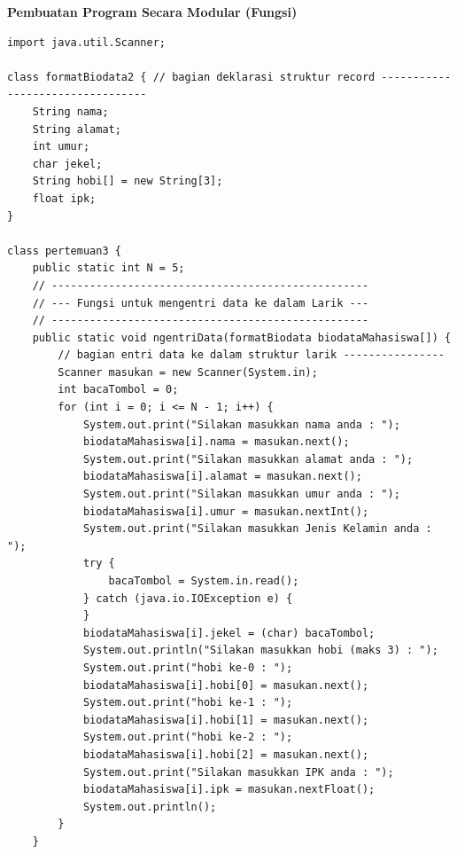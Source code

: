 \documentclass[a4paper,12pt]{article}
\begin{document}
\begin{center}
\end{center}

\textbf{Pembuatan Program Secara Modular (Fungsi)}
\begin{lstlisting}
import java.util.Scanner;

class formatBiodata2 { // bagian deklarasi struktur record ---------------------------------
    String nama;
    String alamat;
    int umur;
    char jekel;
    String hobi[] = new String[3];
    float ipk;
}

class pertemuan3 {
    public static int N = 5;
    // --------------------------------------------------
    // --- Fungsi untuk mengentri data ke dalam Larik ---
    // --------------------------------------------------
    public static void ngentriData(formatBiodata biodataMahasiswa[]) {
        // bagian entri data ke dalam struktur larik ----------------
        Scanner masukan = new Scanner(System.in);
        int bacaTombol = 0;
        for (int i = 0; i <= N - 1; i++) {
            System.out.print("Silakan masukkan nama anda : ");
            biodataMahasiswa[i].nama = masukan.next();
            System.out.print("Silakan masukkan alamat anda : ");
            biodataMahasiswa[i].alamat = masukan.next();
            System.out.print("Silakan masukkan umur anda : ");
            biodataMahasiswa[i].umur = masukan.nextInt();
            System.out.print("Silakan masukkan Jenis Kelamin anda : ");
            try {
                bacaTombol = System.in.read();
            } catch (java.io.IOException e) {
            }
            biodataMahasiswa[i].jekel = (char) bacaTombol;
            System.out.println("Silakan masukkan hobi (maks 3) : ");
            System.out.print("hobi ke-0 : ");
            biodataMahasiswa[i].hobi[0] = masukan.next();
            System.out.print("hobi ke-1 : ");
            biodataMahasiswa[i].hobi[1] = masukan.next();
            System.out.print("hobi ke-2 : ");
            biodataMahasiswa[i].hobi[2] = masukan.next();
            System.out.print("Silakan masukkan IPK anda : ");
            biodataMahasiswa[i].ipk = masukan.nextFloat();
            System.out.println();
        }
    }


\end{lstlisting}
\end{document}
